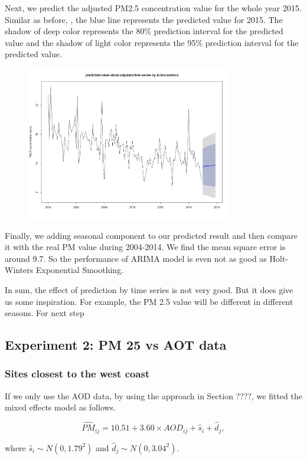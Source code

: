 \documentclass[10pt]{article}
\begin{document}
Next, we predict the adjusted PM2.5 concentration value for the whole year 2015. Similar as before, , the blue line represents the predicted value for 2015. The shadow of deep color represents the 80\% prediction interval for the predicted value and the shadow of light color represents the 95\% prediction interval for the predicted value.

\begin{figure}[ht!]
\centering
\includegraphics[width = 90mm]{ts6.png}
\end{figure}

Finally, we adding seasonal component to our predicted result and then compare it with the real PM value during 2004-2014. We find the mean square error is around 9.7. So the performance of ARIMA model is even not as good as Holt-Winters Exponential Smoothing.

In sum, the effect of prediction by time series is not very good. But it does give us some inspiration. For example, the PM 2.5 value will be different in different seasons. For next step

\subsection{Experiment 2: PM 25 vs AOT data}

\subsubsection{Sites closest to the west coast}
If we only use the AOD data, by using the approach in Section ????, we fitted the mixed effects model as follows.

$$\hat{PM}_{ij} = 10.51 + 3.60\times AOD_{ij} + \hat{s}_i + \hat{d}_j, $$

where $\hat{s}_i\sim N(0, 1.79^2)$ and $\hat{d}_j\sim N(0, 3.04^2)$. 
\end{document}

